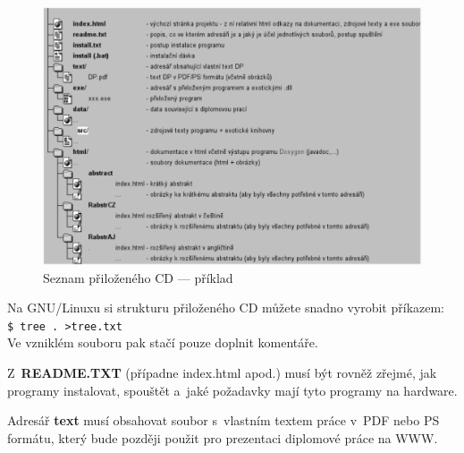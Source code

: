\documentclass[11pt,twoside,a4paper]{book}
\begin{document}
\begin{figure}[h]
\begin{center}
\includegraphics[width=14cm]{figures/seznamcd}
\caption{Seznam přiloženého CD --- příklad}
\label{fig:seznamcd}
\end{center}
\end{figure}

Na GNU/Linuxu si strukturu přiloženého CD můžete snadno vyrobit příkazem:\\ 
\verb|$ tree . >tree.txt|\\
Ve vzniklém souboru pak stačí pouze doplnit komentáře.

Z~\textbf{README.TXT} (případne index.html apod.)  musí být rovněž zřejmé, jak programy instalovat, spouštět a~jaké
požadavky mají tyto programy na hardware.

Adresář \textbf{text}  musí obsahovat soubor s~vlastním textem práce v~PDF nebo PS formátu, který bude později použit
pro prezentaci diplomové práce na WWW.
\end{document}
